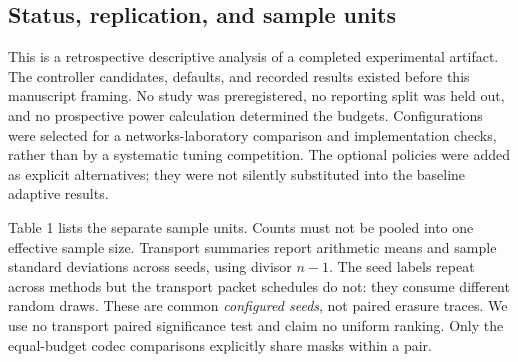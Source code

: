 \documentclass[11pt,a4paper]{article}
\begin{document}
\subsection{Status, replication, and sample units}
This is a retrospective descriptive analysis of a completed experimental artifact. The controller candidates, defaults, and recorded results existed before this manuscript framing. No study was preregistered, no reporting split was held out, and no prospective power calculation determined the budgets. Configurations were selected for a networks-laboratory comparison and implementation checks, rather than by a systematic tuning competition. The optional policies were added as explicit alternatives; they were not silently substituted into the baseline adaptive results.

Table 1 lists the separate sample units. Counts must not be pooled into one effective sample size. Transport summaries report arithmetic means and sample standard deviations across seeds, using divisor $n-1$. The seed labels repeat across methods but the transport packet schedules do not: they consume different random draws. These are common \emph{configured seeds}, not paired erasure traces. We use no transport paired significance test and claim no uniform ranking. Only the equal-budget codec comparisons explicitly share masks within a pair.
\end{document}
